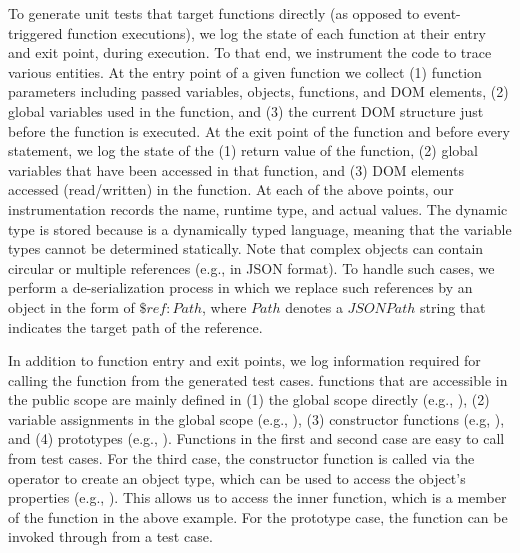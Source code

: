  \label{Sec:jsFuncTesting}
To generate unit tests that target \javascript functions directly (as opposed to event-triggered function executions), we log the state of each function at their entry and exit point, during execution.
To that end, we instrument the code to trace  various entities.
%
At the entry point of a given \javascript function we collect (1) function parameters including passed variables, objects, functions, and DOM elements, (2) global variables used in the function, and (3) the current DOM structure just before the function is executed. At the exit point of the \javascript function and before every  statement, we log the state of the (1) return value of the function, (2) global variables that have been accessed in that function, and (3) DOM elements accessed (read/written) in the function.
At each of the above points, our instrumentation records the name, runtime type, and actual values.
The dynamic type is stored because \javascript is a dynamically typed language, meaning that the variable types cannot be determined statically. 
Note that complex \javascript objects can contain circular or multiple references (e.g., in JSON format). To handle such cases, we perform a de-serialization process in which we replace such references by an object in the form
of ${\$ref: Path}$, where $Path$ denotes a $JSONPath$ string that indicates the target path of the reference.

In addition to function entry and exit points, we log information required for calling  the function from the generated test cases. %
\javascript functions that are accessible in the public scope are mainly defined in  (1) the global scope directly (e.g., ), (2) variable assignments   in the global scope (e.g., ), (3) constructor functions (e.g,  ), and (4) prototypes (e.g., ). 
Functions in the first and second case are easy to call from test cases. For the third case, the constructor function is called via the  operator to create an object type, which can be used to access the object's properties
(e.g., ).
This allows us to access the inner function, which is a member of the  function in the above example.
For the prototype case, the function can be invoked through  from a test case. 

